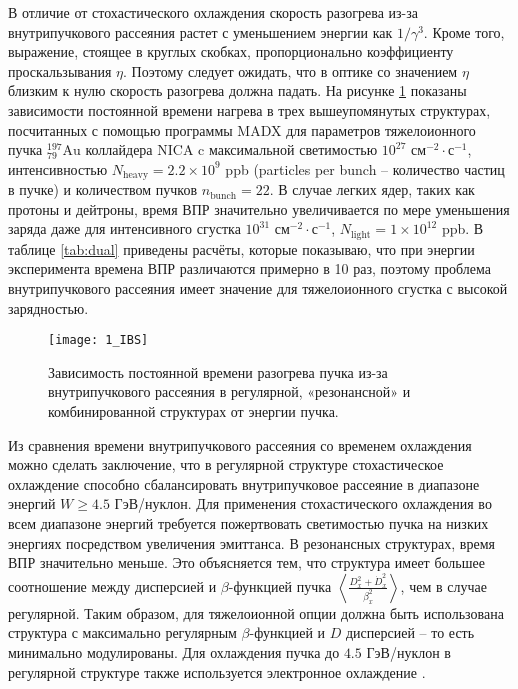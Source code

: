 \noindent В отличие от стохастического охлаждения скорость разогрева из-за внутрипучкового рассеяния растет с уменьшением энергии как $1/\gamma^3$. Кроме того, выражение, стоящее в круглых скобках, пропорционально коэффициенту проскальзывания $\eta$. Поэтому следует ожидать, что в оптике со значением $\eta$ близким к нулю скорость разогрева должна падать. На рисунке \ref{fig:1_IBS} показаны зависимости постоянной времени нагрева в трех вышеупомянутых структурах, посчитанных с помощью программы MADX \cite{madx, antoniou:ibs} для параметров тяжелоионного пучка ${_{79}^{197}}\textrm{Au}$ коллайдера NICA c максимальной светимостью ${10}^{27}$ $\text{см}^{-2}\cdot\text{с}^{-1}$, интенсивностью $N_{\text{heavy}} = 2.2\times10^9$ ppb (particles per bunch -- количество частиц в пучке) и количеством пучков $n_{\text{bunch}}=22$. В случае легких ядер, таких как протоны и дейтроны, время ВПР значительно увеличивается по мере уменьшения заряда даже для интенсивного сгустка ${10}^{31}$ $\text{см}^{-2}\cdot\text{с}^{-1}$, $N_{\text{light}} = 1\times10^{12}$ ppb. В таблице \ref{tab:dual} приведены расчёты, которые показываю, что при энергии эксперимента времена ВПР различаются примерно в 10 раз, поэтому проблема внутрипучкового рассеяния имеет значение для тяжелоионного сгустка с высокой зарядностью.

\begin{figure}[!h]
  \centering
   \texttt{[image: 1\_IBS]}
   \caption{Зависимость постоянной времени разогрева пучка из-за внутрипучкового рассеяния в регулярной, «резонансной» и комбинированной структурах от энергии пучка.}
   \label{fig:1_IBS}
\end{figure}

\noindent Из сравнения времени внутрипучкового рассеяния со временем охлаждения можно сделать заключение, что в регулярной структуре стохастическое охлаждение способно сбалансировать внутрипучковое рассеяние в диапазоне энергий $W\geq4.5$ ГэВ/нуклон. Для применения стохастического охлаждения во всем диапазоне энергий требуется пожертвовать светимостью пучка на низких энергиях посредством увеличения эмиттанса. В резонансных структурах, время ВПР значительно меньше. Это объясняется тем, что структура имеет большее соотношение между дисперсией и $\beta$-функцией пучка $\left\langle\frac{D_x^2+{\dot{D}}_x^2}{\beta_x^2}\right\rangle$, чем в случае регулярной. Таким образом, для тяжелоионной опции должна быть использована структура с максимально регулярным $\beta$-функцией и $D$ дисперсией -- то есть минимально модулированы. Для охлаждения пучка до $4.5$ ГэВ/нуклон в регулярной структуре также используется электронное охлаждение \cite{kostromin:stochastic}.

